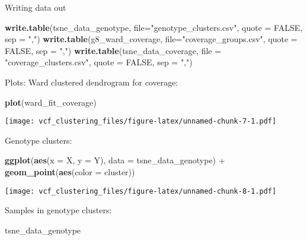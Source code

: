 \documentclass[]{article}
\newenvironment{Shaded}{\begin{snugshade}}{\end{snugshade}}
\newcommand{\KeywordTok}[1]{\textcolor[rgb]{0.13,0.29,0.53}{\textbf{{#1}}}}
\newcommand{\DataTypeTok}[1]{\textcolor[rgb]{0.13,0.29,0.53}{{#1}}}
\newcommand{\StringTok}[1]{\textcolor[rgb]{0.31,0.60,0.02}{{#1}}}
\newcommand{\OtherTok}[1]{\textcolor[rgb]{0.56,0.35,0.01}{{#1}}}
\newcommand{\NormalTok}[1]{{#1}}
\begin{document}
Writing data out

\begin{Shaded}
\begin{Highlighting}[]
\KeywordTok{write.table}\NormalTok{(tsne_data_genotype, }\DataTypeTok{file=}\StringTok{"genotype_clusters.csv"}\NormalTok{, }\DataTypeTok{quote =} \OtherTok{FALSE}\NormalTok{, }\DataTypeTok{sep =} \StringTok{","}\NormalTok{)}
\KeywordTok{write.table}\NormalTok{(g8_ward_coverage, }\DataTypeTok{file=}\StringTok{"coverage_groups.csv"}\NormalTok{, }\DataTypeTok{quote =} \OtherTok{FALSE}\NormalTok{, }\DataTypeTok{sep =} \StringTok{","}\NormalTok{)}
\KeywordTok{write.table}\NormalTok{(tsne_data_coverage, }\DataTypeTok{file =} \StringTok{"coverage_clusters.csv"}\NormalTok{, }\DataTypeTok{quote =} \OtherTok{FALSE}\NormalTok{, }\DataTypeTok{sep =} \StringTok{","}\NormalTok{)}
\end{Highlighting}
\end{Shaded}

Plots: Ward clustered dendrogram for coverage:

\begin{Shaded}
\begin{Highlighting}[]
\KeywordTok{plot}\NormalTok{(ward_fit_coverage)}
\end{Highlighting}
\end{Shaded}

\texttt{[image: vcf\_clustering\_files/figure-latex/unnamed-chunk-7-1.pdf]}

Genotype clusters:

\begin{Shaded}
\begin{Highlighting}[]
\KeywordTok{ggplot}\NormalTok{(}\KeywordTok{aes}\NormalTok{(}\DataTypeTok{x =} \NormalTok{X, }\DataTypeTok{y =} \NormalTok{Y), }\DataTypeTok{data =} \NormalTok{tsne_data_genotype) +}
\StringTok{  }\KeywordTok{geom_point}\NormalTok{(}\KeywordTok{aes}\NormalTok{(}\DataTypeTok{color =} \NormalTok{cluster))}
\end{Highlighting}
\end{Shaded}

\texttt{[image: vcf\_clustering\_files/figure-latex/unnamed-chunk-8-1.pdf]}

Samples in genotype clusters:

\begin{Shaded}
\begin{Highlighting}[]
\NormalTok{tsne_data_genotype}
\end{Highlighting}
\end{Shaded}
\end{document}
